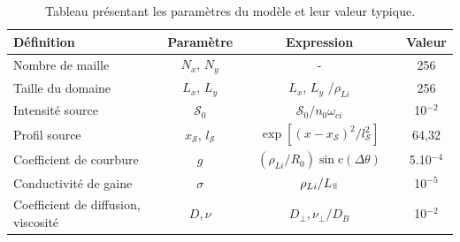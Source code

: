 \begin{refsection}
\begin{table}[!htbp]
\footnotesize\centering
{}
\begin{tabular}{@{}lcccccc@{}}\toprule
Définition&&Paramètre&&Expression&&Valeur\\
\midrule 
Nombre de maille&&$N_x$, $N_y$ && - && 256\\
Taille du domaine&&$L_x$, $L_y$ &&$L_x$, $L_y$ /$\rho_{Li}$ && 256\\
Intensité source&&$\mathcal{S}_0$ &&
$\mathcal{S}_0$/$n_0\omega_{ci}$
&& 10$^{-2}$\\
Profil source&& $x_\mathcal{S}$,
$l_\mathcal{S}$ && $\exp[(x-x_\mathcal{S})^2/l_\mathcal{S}^2]$
&& 64,32\\
Coefficient de courbure&&$g$ &&
$(\rho_{Li}/R_0)\sin\text{c}(\Delta\theta)$\footnotemark &&
5.10$^{-4}$\\
Conductivité de gaine&&$\sigma$ &&
$\rho_{Li}/L_\para$ &&
10$^{-5}$\\
Coefficient de diffusion, viscosité&&$D,\nu$ &&
$D_\perp,\nu_\perp/D_B$ &&
10$^{-2}$\\
\bottomrule
\end{tabular}
\caption{Tableau présentant les paramètres du modèle et
leur valeur typique.}\label{2-TokamParam}
\end{table}


\end{refsection}
